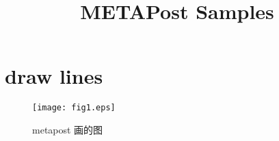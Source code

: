 \documentclass[a4paper,9pt,twoside,openany]{article}
\begin{document}
\title{METAPost Samples}
\section{draw lines}
\begin{figure}
\centering
\texttt{[image: fig1.eps]}
\caption{metapost 画的图}
\end{figure}
\end{document}
